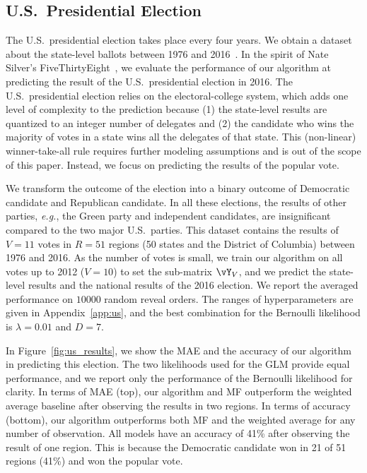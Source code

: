 \subsection{U.S.\ Presidential Election}

The U.S.\ presidential election takes place every four years.
We obtain a dataset about the state-level ballots between 1976 and 2016~\citep{mit2017us}.
In the spirit of Nate Silver's FiveThirtyEight~\citep{silver2008pollster}, we evaluate the performance of our algorithm at predicting the result of the U.S.\ presidential election in 2016.
The U.S.\ presidential election relies on the electoral-college system, which adds one level of complexity to the prediction because (1) the state-level results are quantized to an integer number of delegates and (2) the candidate who wins the majority of votes in a state wins all the delegates of that state.
This (non-linear) winner-take-all rule requires further modeling assumptions and is out of the scope of this paper.
Instead, we focus on predicting the results of the popular vote.

We transform the outcome of the election into a binary outcome of Democratic candidate and Republican candidate.
In all these elections, the results of other parties, \textit{e.g.}, the Green party and independent candidates, are insignificant compared to the two major U.S.\ parties.
This dataset contains the results of $V = 11$ votes in $R = 51$ regions (50 states and the District of Columbia) between 1976 and 2016.
As the number of votes is small, we train our algorithm on all votes up to 2012 ($V = 10$) to set the sub-matrix $\vY_V$, and we predict the state-level results and the national results of the 2016 election.
We report the averaged performance on $10000$ random reveal orders.
The ranges of hyperparameters are given in Appendix~\ref{app:us}, and the best combination for the Bernoulli likelihood is $\lambda = 0.01 $ and $D = 7$.

In Figure~\ref{fig:us_results}, we show the MAE and the accuracy of our algorithm in predicting this election.
The two likelihoods used for the GLM provide equal performance, and we report only the performance of the Bernoulli likelihood for clarity.
In terms of MAE (top), our algorithm and MF outperform the weighted average baseline after observing the results in two regions.
In terms of accuracy (bottom), our algorithm outperforms both MF and the weighted average for any number of observation.
All models have an accuracy of 41\% after observing the result of one region.
This is because the Democratic candidate won in 21 of 51 regions (41\%) and won the popular vote.

